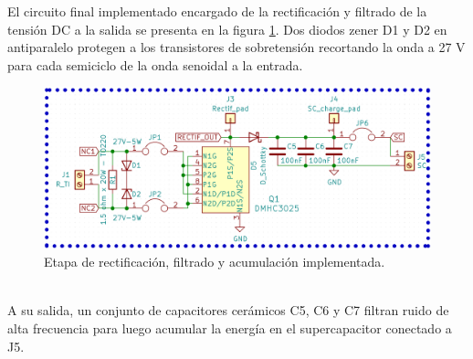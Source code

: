 El circuito final implementado encargado de la rectificación y filtrado de la tensión DC a la salida se presenta en la figura \ref{fig:ctorectificacionfiltrado}. Dos diodos zener D1 y D2 en antiparalelo protegen a los transistores de sobretensión recortando la onda a 27 V para cada semiciclo de la onda senoidal a la entrada.\\
\begin{figure}[h]
	\centering
	\includegraphics[width=1.0\linewidth]{Figures/cto_rectificacion_filtrado}
	\caption{Etapa de rectificación, filtrado y acumulación implementada.}
	\label{fig:ctorectificacionfiltrado}
\end{figure}\\
A su salida, un conjunto de capacitores cerámicos C5, C6 y C7 filtran ruido de alta frecuencia para luego acumular la energía en el supercapacitor conectado a J5.

